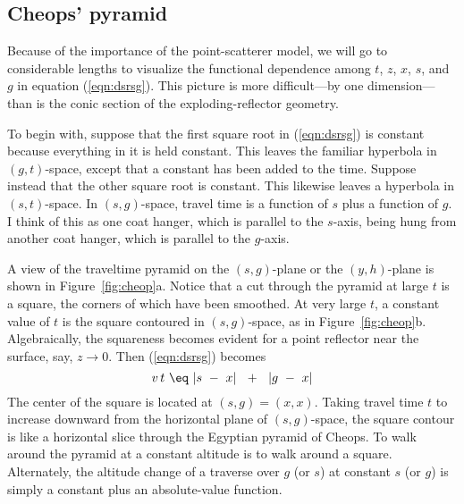 \subsection{Cheops' pyramid}
\par
Because of the importance of the point-scatterer model,
we will go to considerable lengths to visualize the functional dependence
among $t$, $z$, $x$, $s$, and $g$ in equation (\ref{eqn:dsrsg}).
This picture is more difficult---by one dimension---than is
the conic section of the exploding-reflector geometry.
\par
To begin with,
suppose that the first square root in (\ref{eqn:dsrsg}) is constant
because everything in it is held constant.
This leaves the familiar hyperbola in  $(g,t)$-space,
except that a constant has been added to the time.
Suppose instead that the other square root is constant.
This likewise leaves a hyperbola in  $(s,t)$-space.
In  $(s,g)$-space, travel time is a function of  $s$  plus a function of  $g$.
I think of this as one coat hanger, which is 
parallel to the $s$-axis, being hung from another coat hanger,
which is parallel to the $g$-axis.
\par
A view of the traveltime pyramid on the  $(s,g)$-plane
or the  $(y,h)$-plane is shown in Figure~\ref{fig:cheop}a.
\newslide
Notice that a cut through the pyramid at
large  $t$  is a square, the corners of which have been smoothed.
At very large  $t$,
a constant value of  $t$  is the square contoured in  $(s,g)$-space,
as in Figure~\ref{fig:cheop}b.
Algebraically, the squareness becomes evident for a point reflector
near the surface, say,  $z  \to  0$.
Then (\ref{eqn:dsrsg}) becomes
\begin{equation}
v\,t\  \eq \ | s \ -\  x |\ \ +\ \ | g \ -\  x |
\label{eqn:2.4}
\end{equation}
The center of the square is located at  $(s,g) = (x,x)$.
Taking travel time  $t$  to increase downward
from the horizontal plane of  $(s,g)$-space,
the square contour is like a horizontal slice through the Egyptian pyramid
of Cheops.
To walk around the pyramid at a constant altitude 
is to walk around a square.
Alternately,
the altitude change of a traverse over
$g$  (or $s$) at constant
$s$  (or $g$) is simply a constant plus an absolute-value function.
